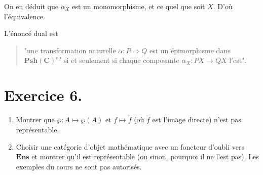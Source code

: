 \documentclass{../../td}
\begin{document}
  On en déduit que $\alpha_X$ est un monomorphisme, et ce quel que soit $X$. D'où l'équivalence.

  L'énoncé dual est 
  \begin{quote}
    "une transformation naturelle $\alpha : P \Rightarrow Q$ est un épimorphisme dans $\mathbf{Psh}(\mathbf{C})^\mathrm{op}$ si et seulement si chaque composante $\alpha_X : PX \to QX$ l'est".
  \end{quote}

  \chapter{Exercice 6.}
  \begin{slshape}
    \color{deepblue}
    \begin{enumerate}
      \item Montrer que $\wp : A \mapsto \wp(A)$ et $f \mapsto \tilde{f}$ (où $\tilde{f}$ est l'image directe) n'est pas représentable.
      \item Choisir une catégorie d’objet mathématique avec un foncteur d’oubli vers $\mathbf{Ens}$ et montrer qu’il est représentable (ou sinon, pourquoi il ne l’est pas). Les exemples du cours ne sont pas autorisés.
    \end{enumerate}
  \end{slshape}
\end{document}
